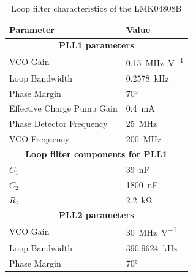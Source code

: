 \begin{table}[tb]
	\caption[LMK04808B loop filter characteristics]{Loop filter characteristics of the LMK04808B}
	\label{tab:lmk04808B_filter}
	\centering
	\begin{tabularx}{\textwidth}{Xl}
		\toprule
		\textbf{Parameter}                                                        & \textbf{Value}           \\ \midrule
		                            \multicolumn{2}{c}{\textbf{PLL1 parameters}}                             \\
		VCO Gain                                                                  & \SI{0.15}{\MHz\per\volt} \\
		Loop Bandwidth                                                            & \SI{0.2578}{\kHz}        \\
		Phase Margin                                                              & \ang{70}                 \\
		Effective Charge Pump Gain                                                & \SI{0.4}{\milli\ampere}  \\
		Phase Detector Frequency                                                  & \SI{25}{\MHz}            \\
		VCO Frequency                                                             & \SI{200}{\MHz}           \\
		                    \multicolumn{2}{c}{\textbf{Loop filter components for PLL1}}                     \\
		$C_{1}$                                                                   & \SI{39}{\nano\farad}     \\
		$C_{2}$                                                                   & \SI{1800}{\nano\farad}   \\
		$R_{2}$                                                                   & \SI{2.2}{\kilo\ohm}      \\
		[0.3cm]
	    \multicolumn{2}{c}{\textbf{PLL2 parameters}}                   \\
		VCO Gain                                                                  & \SI{30}{\MHz\per\volt}   \\
		Loop Bandwidth                                                            & \SI{390.9624}{\kHz}      \\
		Phase Margin                                                              & \ang{70}                 \\

\end{tabularx}
\end{table}
